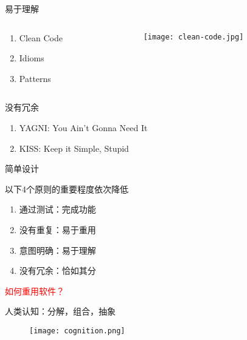 \begin{frame}{易于理解}
  \begin{columns} 
  \begin{column}{0.3\textwidth}
  \begin{enumerate}
    \item \alert{Clean Code}
    \item \alert{Idioms}
    \item \alert{Patterns}
  \end{enumerate}
  \end{column}  

  \begin{column}{0.7\textwidth}
  \begin{figure}
    \centering
    \texttt{[image: clean-code.jpg]}
  \end{figure}
  \end{column}
  \end{columns}   
\end{frame}

\begin{frame}{没有冗余}
  \begin{enumerate}
    \item \alert{YAGNI}: You Ain't Gonna Need It
    \item \alert{KISS}: Keep it Simple, Stupid
  \end{enumerate}
\end{frame}

\begin{frame}{简单设计}
  \begin{block}{以下4个原则的重要程度依次降低}
    \begin{enumerate}
    \item \alert{通过测试}：完成功能
    \item \alert{没有重复}：易于重用
    \item \alert{意图明确}：易于理解
    \item \alert{没有冗余}：恰如其分
    \end{enumerate}
  \end{block}
\end{frame}

\begin{frame}
  \begin{center}
    \huge{\textcolor{red}{如何重用软件？}}
  \end{center}
\end{frame}

\begin{frame}{人类认知：分解，组合，抽象}
  \begin{figure}
    \centering
    \texttt{[image: cognition.png]}
  \end{figure}
\end{frame}

